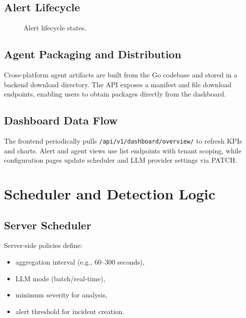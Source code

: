 \documentclass[conference]{IEEEtran}
\begin{document}
\subsection{Alert Lifecycle}
\begin{figure}[!t]
\centering
{}
\caption{Alert lifecycle states.}
\label{fig:alert-states}
\end{figure}

\subsection{Agent Packaging and Distribution}
Cross-platform agent artifacts are built from the Go codebase and stored in a backend download directory. The API exposes a manifest and file download endpoints, enabling users to obtain packages directly from the dashboard.

\subsection{Dashboard Data Flow}
The frontend periodically pulls \texttt{/api/v1/dashboard/overview/} to refresh KPIs and charts. Alert and agent views use list endpoints with tenant scoping, while configuration pages update scheduler and LLM provider settings via PATCH.

\section{Scheduler and Detection Logic}
\subsection{Server Scheduler}
Server-side policies define:
\begin{itemize}[leftmargin=1.2em]
    \item aggregation interval (e.g., 60--300 seconds),
    \item LLM mode (batch/real-time),
    \item minimum severity for analysis,
    \item alert threshold for incident creation.
\end{itemize}
\end{document}
